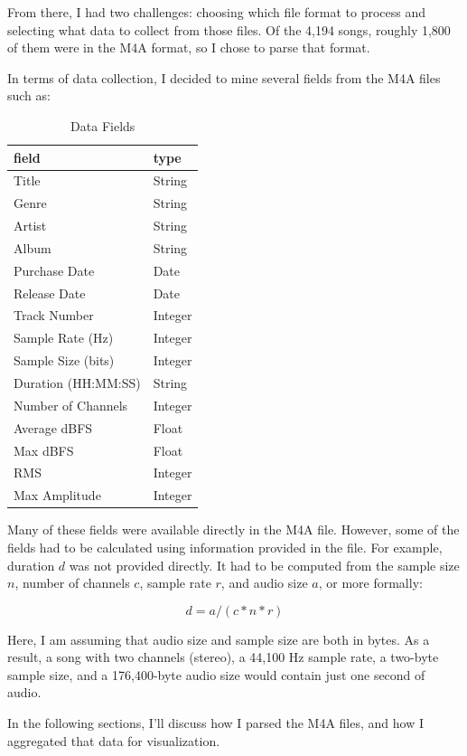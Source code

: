 \documentclass[journal]{vgtc}                %
\begin{document}
From there, I had two challenges: choosing which file format to process and
selecting what data to collect from those files. Of the 4,194 songs, roughly
1,800 of them were in the M4A format, so I chose to parse that format.

In terms of data collection, I decided to mine several fields from the M4A files
such as:

\begin{table}[h]
  \caption{Data Fields}
  \label{tab:fields}
  \scriptsize%
	\centering%
  \begin{tabu}{l l}
  \toprule
    field & type \\
  \midrule
  Title & String \\
  Genre & String \\
  Artist & String \\
  Album & String \\
  Purchase Date & Date \\
  Release Date & Date \\
  Track Number & Integer \\
  Sample Rate (Hz) & Integer \\
  Sample Size (bits) & Integer \\
  Duration (HH:MM:SS) & String \\
  Number of Channels & Integer \\
  Average dBFS & Float \\
  Max dBFS & Float \\
  RMS & Integer \\
  Max Amplitude & Integer \\
  \midrule
  \end{tabu}%
\end{table}

Many of these fields were available directly in the M4A file. However, some of
the fields had to be calculated using information provided in the file. For
example, duration $d$ was not provided directly. It had to be computed from the
sample size $n$, number of channels $c$, sample rate $r$, and audio size $a$, or
more formally:

\[ d = a / (c * n * r) \]

Here, I am assuming that audio size and sample size are both in bytes. As a
result, a song with two channels (stereo), a 44,100 Hz sample rate, a two-byte
sample size, and a 176,400-byte audio size would contain just one second of
audio. 

In the following sections, I'll discuss how I parsed the M4A files, and how
I aggregated that data for visualization.
\end{document}
